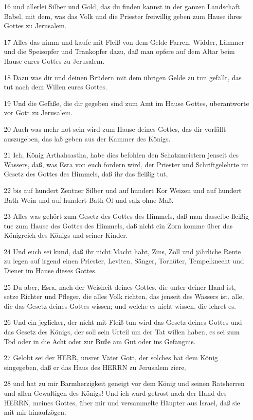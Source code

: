 \par 16 und allerlei Silber und Gold, das du finden kannst in der ganzen Landschaft Babel, mit dem, was das Volk und die Priester freiwillig geben zum Hause ihres Gottes zu Jerusalem.
\par 17 Alles das nimm und kaufe mit Fleiß von dem Gelde Farren, Widder, Lämmer und die Speisopfer und Trankopfer dazu, daß man opfere auf dem Altar beim Hause eures Gottes zu Jerusalem.
\par 18 Dazu was dir und deinen Brüdern mit dem übrigen Gelde zu tun gefällt, das tut nach dem Willen eures Gottes.
\par 19 Und die Gefäße, die dir gegeben sind zum Amt im Hause Gottes, überantworte vor Gott zu Jerusalem.
\par 20 Auch was mehr not sein wird zum Hause deines Gottes, das dir vorfällt auszugeben, das laß geben aus der Kammer des Königs.
\par 21 Ich, König Arthahsastha, habe dies befohlen den Schatzmeistern jenseit des Wassers, daß, was Esra von euch fordern wird, der Priester und Schriftgelehrte im Gesetz des Gottes des Himmels, daß ihr das fleißig tut,
\par 22 bis auf hundert Zentner Silber und auf hundert Kor Weizen und auf hundert Bath Wein und auf hundert Bath Öl und salz ohne Maß.
\par 23 Alles was gehört zum Gesetz des Gottes des Himmels, daß man dasselbe fleißig tue zum Hause des Gottes des Himmels, daß nicht ein Zorn komme über das Königreich des Königs und seiner Kinder.
\par 24 Und euch sei kund, daß ihr nicht Macht habt, Zins, Zoll und jährliche Rente zu legen auf irgend einen Priester, Leviten, Sänger, Torhüter, Tempelknecht und Diener im Hause dieses Gottes.
\par 25 Du aber, Esra, nach der Weisheit deines Gottes, die unter deiner Hand ist, setze Richter und Pfleger, die alles Volk richten, das jenseit des Wassers ist, alle, die das Gesetz deines Gottes wissen; und welche es nicht wissen, die lehret es.
\par 26 Und ein jeglicher, der nicht mit Fleiß tun wird das Gesetz deines Gottes und das Gesetz des Königs, der soll sein Urteil um der Tat willen haben, es sei zum Tod oder in die Acht oder zur Buße am Gut oder ins Gefängnis.
\par 27 Gelobt sei der HERR, unsrer Väter Gott, der solches hat dem König eingegeben, daß er das Haus des HERRN zu Jerusalem ziere,
\par 28 und hat zu mir Barmherzigkeit geneigt vor dem König und seinen Ratsherren und allen Gewaltigen des Königs! Und ich ward getrost nach der Hand des HERRN, meines Gottes, über mir und versammelte Häupter aus Israel, daß sie mit mir hinaufzögen.

